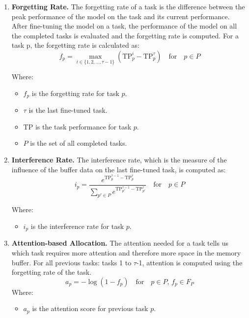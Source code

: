 \begin{enumerate}
\item \textbf{Forgetting Rate.} The forgetting rate of a task is the difference between the peak performance of the model on the task and its current performance. After fine-tuning the model on a task, the performance of the model on all the completed tasks is evaluated and the forgetting rate is computed. For a task p, the forgetting rate is calculated as:
\begin{equation} \label{ForgettingRate}
f_p = \max_{i \in \{1, 2, \ldots, \tau - 1\}} \left( \text{TP}_p^i - \text{TP}_p^\tau \right) \quad \text{for} \quad p \in P
\end{equation}

Where:
\begin{itemize}
    \item \( f_p \) is the forgetting rate for task \( p \).
    \item \( \tau \) is the last fine-tuned task.
    \item \(\text{TP}\) is the task performance for task \( p \).
    \item \( P \) is the set of all completed tasks.
\end{itemize}

\item \textbf{Interference Rate.} The interference rate, which is the measure of the influence of the buffer data on the last fine-tuned task, is computed as:
\begin{equation} \label{InterferenceRate}
i_p = \frac{e^{\text{TP}_p^{\tau-1} - \text{TP}_p^\tau}}{\sum_{p' \in P} e^{\text{TP}_{p'}^{\tau-1} - \text{TP}_{p'}^\tau}} \quad \text{for} \quad p \in P
\end{equation}

Where:
\begin{itemize}
    \item \( i_p \) is the interference rate for task \( p \).
\end{itemize}

\item \textbf{Attention-based Allocation.} The attention needed for a task tells us which task requires more attention and therefore more space in the memory buffer. For all previous tasks: tasks 1 to \( \tau \)-1, attention is computed using the forgetting rate of the task.
\begin{equation} \label{attention}
a_p = -\log(1 - f_p) \quad \text{for} \quad p \in P, \, f_p \in F_P
\end{equation}
Where:
\begin{itemize}
    \item \( a_p \) is the attention score for previous task \( p \).
\end{itemize}


\end{enumerate}
